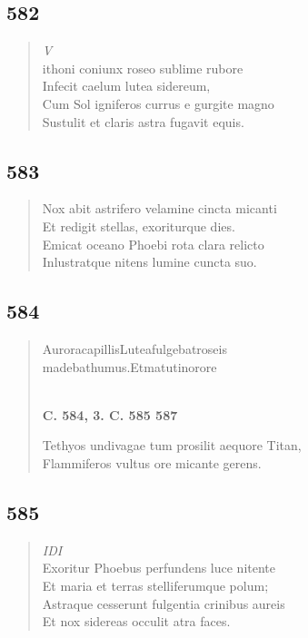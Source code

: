 \documentclass[11pt, a4paper]{report}
\begin{document}
            \subsection*{582}
      \begin{verse}
      \textit{V} \\ ithoni coniunx roseo sublime rubore \\ Infecit caelum lutea sidereum, \\ Cum Sol igniferos currus e gurgite magno \\ Sustulit et claris astra fugavit equis. \\ 
      \end{verse}
  
            \subsection*{583}
      \begin{verse}
      Nox abit astrifero velamine cincta micanti \\ Et redigit stellas, exoriturque dies. \\ Emicat oceano Phoebi rota clara relicto \\ Inlustratque nitens lumine cuncta suo. \\ 
      \end{verse}
  
            \subsection*{584}
      \begin{verse}
      AuroracapillisLuteafulgebatroseis \\ madebathumus.Etmatutinorore \\ 
        ﻿\pagebreak 
    \begin{center} \textbf{C. 584, 3. C. 585 587} \end{center} \marginpar{[81]} Tethyos undivagae tum prosilit aequore Titan, \\ Flammiferos vultus ore micante gerens. \\ 
      \end{verse}
  
            \subsection*{585}
      \begin{verse}
      \textit{IDI} \\ Exoritur Phoebus perfundens luce nitente \\ Et maria et terras stelliferumque polum; \\ Astraque cesserunt fulgentia crinibus aureis \\ Et nox sidereas occulit atra faces. \\ 
      \end{verse}
  
\end{document}
